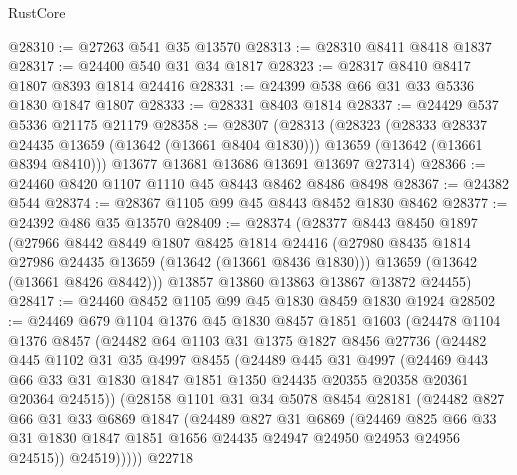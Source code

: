 \begin{lexlean}{RustCore}
\begin{coremodule}
@28310 := @27263 @541 @35 @13570
@28313 := @28310 @8411 @8418 @1837
@28317 := @24400 @540 @31 @34 @1817
@28323 := @28317 @8410 @8417 @1807 @8393 @1814 @24416
@28331 := @24399 @538 @66 @31 @33 @5336 @1830 @1847 @1807
@28333 := @28331 @8403 @1814
@28337 := @24429 @537 @5336 @21175 @21179
@28358 := @28307
    (@28313
      (@28323
        (@28333 @28337 @24435 @13659 (@13642 (@13661 @8404 @1830)))
        @13659
        (@13642 (@13661 @8394 @8410)))
      @13677
      @13681
      @13686
      @13691
      @13697
      @27314)
@28366 := @24460 @8420 @1107 @1110 @45 @8443 @8462 @8486 @8498
@28367 := @24382 @544
@28374 := @28367 @1105 @99 @45 @8443 @8452 @1830 @8462
@28377 := @24392 @486 @35 @13570
@28409 := @28374
    (@28377
      @8443
      @8450
      @1897
      (@27966
        @8442
        @8449
        @1807
        @8425
        @1814
        @24416
        (@27980 @8435 @1814 @27986 @24435 @13659 (@13642 (@13661 @8436 @1830)))
        @13659
        (@13642 (@13661 @8426 @8442)))
      @13857
      @13860
      @13863
      @13867
      @13872
      @24455)
@28417 := @24460 @8452 @1105 @99 @45 @1830 @8459 @1830 @1924
@28502 := @24469
    @679
    @1104
    @1376
    @45
    @1830
    @8457
    @1851
    @1603
    (@24478
      @1104
      @1376
      @8457
      (@24482
        @64
        @1103
        @31
        @1375
        @1827
        @8456
        @27736
        (@24482
          @445
          @1102
          @31
          @35
          @4997
          @8455
          (@24489
            @445
            @31
            @4997
            (@24469
              @443
              @66
              @33
              @31
              @1830
              @1847
              @1851
              @1350
              @24435
              @20355
              @20358
              @20361
              @20364
              @24515))
          (@28158
            @1101
            @31
            @34
            @5078
            @8454
            @28181
            (@24482
              @827
              @66
              @31
              @33
              @6869
              @1847
              (@24489
                @827
                @31
                @6869
                (@24469
                  @825
                  @66
                  @33
                  @31
                  @1830
                  @1847
                  @1851
                  @1656
                  @24435
                  @24947
                  @24950
                  @24953
                  @24956
                  @24515))
              @24519)))))
    @22718

\end{coremodule}
\end{lexlean}
